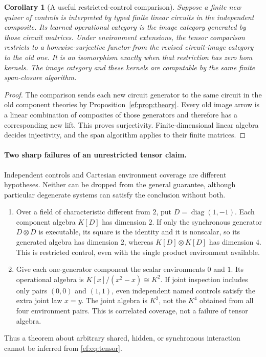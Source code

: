 \documentclass[11pt]{article}
\newtheorem{corollary}[theorem]{Corollary}
\theoremstyle{definition}
\theoremstyle{remark}\newtheorem{remark}[theorem]{Remark}
\begin{document}
\begin{corollary}[A useful restricted-control comparison]
\label{ef:cor:wired-image}
Suppose a finite new quiver of controls is interpreted by typed finite
linear circuits in the independent composite. Its learned operational
category is the image category generated by those circuit matrices.
Under environment extensions, the tensor comparison restricts to a
homwise-surjective functor from the revised circuit-image category to
the old one. It is an isomorphism exactly when that restriction has zero
hom kernels. The image category and these kernels are computable by the
same finite span-closure algorithm.
\end{corollary}
\begin{proof}
The comparison sends each new circuit generator to the same circuit in
the old component theories by Proposition~\ref{ef:prop:theory}. Every old
image arrow is a linear combination of composites of those generators
and therefore has a corresponding new lift. This proves surjectivity.
Finite-dimensional linear algebra decides injectivity, and the span
algorithm applies to their finite matrices.
\end{proof}

\paragraph{Two sharp failures of an unrestricted tensor claim.}
Independent controls and Cartesian environment coverage are different
hypotheses. Neither can be dropped from the general guarantee, although
particular degenerate systems can satisfy the conclusion without both.
\begin{enumerate}
\item Over a field of characteristic different from $2$, put
$D=\operatorname{diag}(1,-1)$. Each component algebra $K[D]$ has dimension
$2$. If only the synchronous generator $D\otimes D$ is executable, its
square is the identity and it is nonscalar, so its generated algebra has
dimension $2$, whereas $K[D]\otimes K[D]$ has dimension $4$. This is
restricted control, even with the single product environment available.
\item Give each one-generator component the scalar environments $0$ and
$1$. Its operational algebra is $K[x]/(x^2-x)\cong K^2$. If joint
inspection includes only pairs $(0,0)$ and $(1,1)$, even independent
named controls satisfy the extra joint law $x=y$. The joint algebra is
$K^2$, not the $K^4$ obtained from all four environment pairs. This is
correlated coverage, not a failure of tensor algebra.
\end{enumerate}
Thus a theorem about arbitrary shared, hidden, or synchronous interaction
cannot be inferred from \eqref{ef:eq:tensor}.
\end{document}
